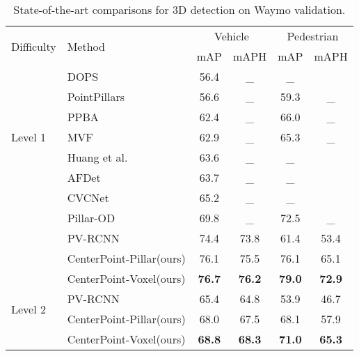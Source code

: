 \documentclass[final]{cvpr}
\begin{document}
{
\begin{table}[t]
\small
\begin{center}
\begin{tabular}{@{}l@{\ \ }l@{\ \ }c@{\ \ }c@{\ \ }c@{\ \ }c@{}}
  \toprule 
   \multirow{2}{4em}{Difficulty} & \multirow{2}{4em}{Method} &  \multicolumn{2}{c}{Vehicle} & \multicolumn{2}{c}{Pedestrian}  \\
   & & mAP & mAPH &  mAP & mAPH \\
       \cmidrule(r){1-2}
    \cmidrule(r){3-4}
    \cmidrule(r){5-6}
  \multirow{7}{3em}{Level 1}  
  & DOPS \cite{najibi2020dops} & 56.4 & \_ & \_ \\ 
  & PointPillars \cite{pillar}  & 56.6 & \_  &  59.3 & \_  \\  
  & PPBA \cite{ngiam2019starnet} & 62.4 & \_ & 66.0 & \_  \\   
  & MVF \cite{mvf}  & 62.9 & \_ & 65.3& \_  \\ 
  & Huang et al. \cite{huang2020lstm}  & 63.6 & \_ & \_  \\
  & AFDet \cite{ge2020afdet} & 63.7 & \_ & \_ \\ 
  & CVCNet \cite{chen2020view} & 65.2 & \_ & \_ \\ 
  & Pillar-OD \cite{wang2020pillar}  & 69.8 & \_ & 72.5& \_  \\ 
  & PV-RCNN \cite{pvrcnn}  & 74.4 & 73.8 & 61.4& 53.4  \\
  & CenterPoint-Pillar(ours) & 76.1 & 75.5 & 76.1 & 65.1  \\ 
  & CenterPoint-Voxel(ours) & \textbf{76.7} & \textbf{76.2} & \textbf{79.0} & \textbf{72.9}  \\
  \midrule
  \multirow{2}{3em}{Level 2}  
  & PV-RCNN \cite{pvrcnn} & 65.4 & 64.8 & 53.9 & 46.7 \\ 
  & CenterPoint-Pillar(ours) & 68.0 & 67.5 & 68.1 & 57.9 \\ 
  & CenterPoint-Voxel(ours) &  \textbf{68.8} & \textbf{68.3} & \textbf{71.0} & \textbf{65.3} \\ 
  \bottomrule
 
 \end{tabular}
\end{center}
\vspace{-5mm}
\caption{State-of-the-art comparisons for 3D detection on Waymo validation.}
\end{table}
}
\end{document}
